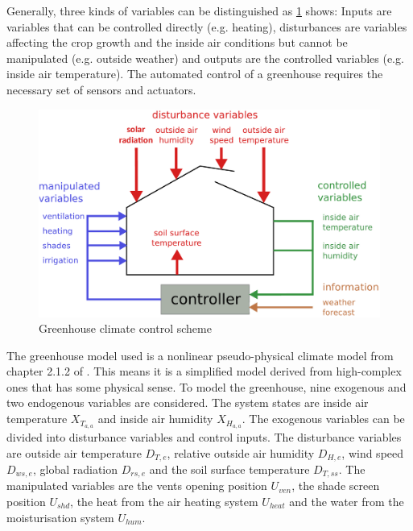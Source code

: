 Generally, three kinds of variables can be distinguished as \cref{fig:greenhouse} shows: Inputs are variables that can be controlled directly (e.g. heating), disturbances are variables affecting the crop growth and the inside air conditions but cannot be manipulated (e.g. outside weather) and outputs are the controlled variables (e.g. inside air temperature).
The automated control of a greenhouse requires the necessary set of sensors and actuators.

\begin{figure}[t]
\begin{center}
\includegraphics[width=\textwidth]{../Figures/greenhouse_quer.pdf}
\caption{Greenhouse climate control scheme}
\label{fig:greenhouse}
\end{center}
\end{figure}

The greenhouse model used is a nonlinear pseudo-physical climate model from chapter 2.1.2 of \cite{Rodriguez.2015}.
This means it is a simplified model derived from high-complex ones that has some physical sense.
To model the greenhouse, nine exogenous and two endogenous variables are considered.
The system states are inside air temperature $X_{T_{a,a}}$ and inside air humidity $X_{H_{a,a}}$.
The exogenous variables can be divided into disturbance variables and control inputs.
The disturbance variables are outside air temperature $D_{T,e}$, relative outside air humidity $D_{H,e}$, wind speed $D_{ws,e}$, global radiation $D_{rs,e}$ and the soil surface temperature $D_{T,ss}$.
The manipulated variables are the vents opening position $U_{ven}$, the shade screen position $U_{shd}$, the heat from the air heating system $U_{heat}$ and the water from the moisturisation system $U_{hum}$.

